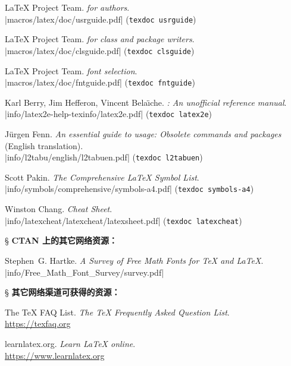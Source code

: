 \begin{thebibliography}{20}
 \LaTeX{} Project Team.
  \newblock \emph{\LaTeXe{} for authors}.\\
  \CTAN|macros/latex/doc/usrguide.pdf| (\texttt{texdoc usrguide})

 \LaTeX{} Project Team.
  \newblock \emph{\LaTeXe{} for class and package writers}. \\
  \CTAN|macros/latex/doc/clsguide.pdf| (\texttt{texdoc clsguide})

 \LaTeX{} Project Team.
  \newblock \emph{\LaTeXe{} font selection}. \\
  \CTAN|macros/latex/doc/fntguide.pdf| (\texttt{texdoc fntguide})

 Karl Berry, Jim Hefferon, Vincent Bela\"{\i}che.
  \newblock \emph{\LaTeXe: An unofficial reference manual}. \\
  \CTAN|info/latex2e-help-texinfo/latex2e.pdf| (\texttt{texdoc latex2e})

 J\"{u}rgen Fenn.
  \newblock \emph{An essential guide to \LaTeXe{} usage: Obsolete commands and packages} (English translation). \\
  \CTAN|info/l2tabu/english/l2tabuen.pdf| (\texttt{texdoc l2tabuen})

 Scott Pakin.
  \newblock \emph{The Comprehensive \LaTeX{} Symbol List}. \\
  \CTAN|info/symbols/comprehensive/symbols-a4.pdf| (\texttt{texdoc symbols-a4})

 Winston Chang.
  \newblock \emph{\LaTeXe{} Cheat Sheet}. \\
  \CTAN|info/latexcheat/latexcheat/latexsheet.pdf| (\texttt{texdoc latexcheat})

\item[\S] {\bfseries CTAN 上的其它网络资源：}

 Stephen~G. Hartke.
  \newblock \emph{A Survey of Free Math Fonts for \TeX{} and \LaTeX}.\\
  \CTAN|info/Free_Math_Font_Survey/survey.pdf|

\item[\S] {\bfseries 其它网络渠道可获得的资源：}

 The \TeX{} FAQ List.
  \newblock \emph{The \TeX{} Frequently Asked Question List}. \\
  \url{https://texfaq.org}

 learnlatex.org.
  \newblock \emph{Learn \LaTeX{} online}. \\
  \url{https://www.learnlatex.org}


\end{thebibliography}
